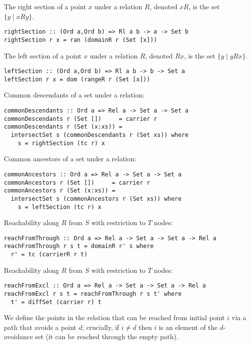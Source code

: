 The right section of a point $x$ under a relation $R$, denoted
$xR$, is the set $\{ y \mid xRy \}$. 

\bc\begin{verbatim}
rightSection :: (Ord a,Ord b) => Rl a b -> a -> Set b
rightSection r x = ran (domainR r (Set [x]))
\end{verbatim}\ec

The left section of a point $x$ under a relation $R$, denoted
$Rx$, is the set $\{ y \mid yRx \}$. 

\bc\begin{verbatim}
leftSection :: (Ord a,Ord b) => Rl a b -> b -> Set a
leftSection r x = dom (rangeR r (Set [x]))
\end{verbatim}\ec

Common descendants of a set under a relation:

\bc\begin{verbatim} 
commonDescendants :: Ord a => Rel a -> Set a -> Set a 
commonDescendants r (Set [])     = carrier r
commonDescendants r (Set (x:xs)) = 
  intersectSet s (commonDescendants r (Set xs)) where 
    s = rightSection (tc r) x
\end{verbatim}\ec

Common ancestors of a set under a relation:

\bc\begin{verbatim} 
commonAncestors :: Ord a => Rel a -> Set a -> Set a 
commonAncestors r (Set [])     = carrier r
commonAncestors r (Set (x:xs)) = 
  intersectSet s (commonAncestors r (Set xs)) where 
    s = leftSection (tc r) x
\end{verbatim}\ec

Reachability along $R$ from $S$ with restriction to $T$ nodes: 

\bc\begin{verbatim}
reachFromThrough :: Ord a => Rel a -> Set a -> Set a -> Rel a 
reachFromThrough r s t = domainR r' s where 
  r' = tc (carrierR r t) 
\end{verbatim}\ec

Reachability along $R$ from $S$ with restriction to $\overline{T}$ nodes: 

\bc\begin{verbatim}
reachFromExcl :: Ord a => Rel a -> Set a -> Set a -> Rel a 
reachFromExcl r s t = reachFromThrough r s t' where 
  t' = diffSet (carrier r) t
\end{verbatim}\ec

We define the points in the relation that can be reached from initial
point $i$ via a path that avoids a point $d$; crucially, if $i \neq d$
then $i$ is an element of the $d$-avoidance set (it can be reached
through the empty path).

